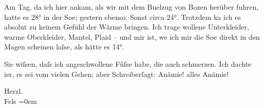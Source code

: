 \pstart
           Am Tag, da ich hier ankam, als wir mit dem Bu{\geminationm}elzug von
                  Bozen herüber fuhren, hatte es 28° in der
                  So{\geminationn}e; gestern ebenso. Sonst circa 24°. {\pb}Trotzdem ka{\geminationn} ich es
               absolut zu keinem Gefühl der Wärme bringen. Ich trage wollene Unterkleider, warme
               Oberkleider, Mantel, Plaid – und mir ist, we{\geminationn} ich mir
               die So{\geminationn}e direkt in den Magen scheinen laſse, als hätte
               es 14°.\pend
           
\pstart
           Sie wiſsen, daſs ich angeschwollene Füſse habe, die auch schmerzen. Ich dachte i{\geminationm}er, es sei vom vielen Gehen; aber Schreiberſagt: Anämie! alles Anämie!\pend
           
\pstart
           Herzl. {\\[\baselineskip]}\spacefill\mbox{Fels}\pend
           \leftskip=0em{}\endnumbering{}  
      